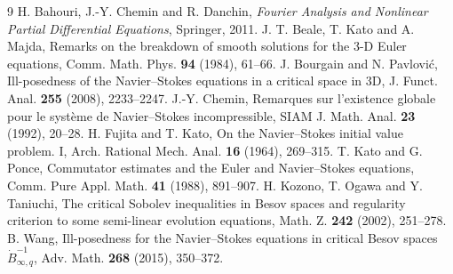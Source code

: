 \documentclass[11pt,a4paper]{article}
\begin{document}
\begin{thebibliography}{9}
 H. Bahouri, J.-Y. Chemin and R. Danchin, \emph{Fourier Analysis and Nonlinear Partial Differential Equations}, Springer, 2011.
 J. T. Beale, T. Kato and A. Majda, Remarks on the breakdown of smooth solutions for the 3-D Euler equations, Comm. Math. Phys. \textbf{94} (1984), 61--66.
 J. Bourgain and N. Pavlovi\'c, Ill-posedness of the Navier--Stokes equations in a critical space in 3D, J. Funct. Anal. \textbf{255} (2008), 2233--2247.
 J.-Y. Chemin, Remarques sur l'existence globale pour le syst\`eme de Navier--Stokes incompressible, SIAM J. Math. Anal. \textbf{23} (1992), 20--28.
 H. Fujita and T. Kato, On the Navier--Stokes initial value problem. I, Arch. Rational Mech. Anal. \textbf{16} (1964), 269--315.
 T. Kato and G. Ponce, Commutator estimates and the Euler and Navier--Stokes equations, Comm. Pure Appl. Math. \textbf{41} (1988), 891--907.
 H. Kozono, T. Ogawa and Y. Taniuchi, The critical Sobolev inequalities in Besov spaces and regularity criterion to some semi-linear evolution equations, Math. Z. \textbf{242} (2002), 251--278.
 B. Wang, Ill-posedness for the Navier--Stokes equations in critical Besov spaces \(\dot B^{-1}_{\infty,q}\), Adv. Math. \textbf{268} (2015), 350--372.
\end{thebibliography}
\end{document}
